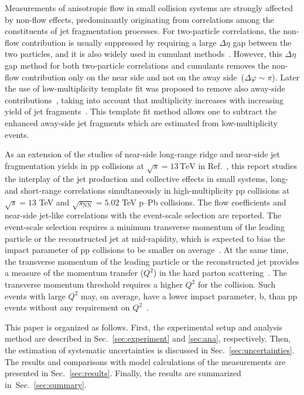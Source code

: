 Measurements of anisotropic flow in small collision systems are strongly affected by non-flow effects, predominantly originating from correlations among the constituents of jet fragmentation processes.
For two-particle correlations, the non-flow contribution is usually suppressed by requiring a large $\Delta\eta$ gap between the two particles,  and it is also widely used in cumulant methods~\cite{Bilandzic:2010jr, Acharya:2019vdf}. However, this $\Delta\eta$ gap method for both two-particle correlations and cumulants removes the non-flow contribution only on the near side and not on the away side~($\Delta\varphi\sim\pi$). Later the use of low-multiplicity template fit was proposed to remove also away-side contributions~\cite{ATLAS:2015hzw,ATLAS:2016yzd,ATLAS:2018ngv}, taking into account that multiplicity increases with increasing yield of jet fragments~\cite{CMS:2013ycn,ALICE:2013tla,ALICE:2014mas}. This template fit method allows one to subtract the enhanced away-side jet fragments which are estimated from low-multiplicity events. %

As an extension of the studies of near-side long-range ridge and near-side jet fragmentation yields in pp collisions at $\sqrt{s}=13\,\mathrm{TeV}$ in Ref.~\cite{ALICE:2021nir}, this report studies the interplay of the jet production and collective effects in small systems, long- and short-range correlations simultaneously in high-multiplicity pp collisions at $\sqrt{s} =13$ TeV and $\sqrt{s_{\mathrm{NN}}}=5.02$ TeV p--Pb collisions. The flow coefficients and near-side jet-like correlations with the event-scale selection are reported. The event-scale selection requires a minimum transverse momentum of the leading particle or the reconstructed jet at mid-rapidity, which is expected to bias the impact parameter of pp collisions to be smaller on average~\cite{Sjostrand:1986ep,Frankfurt:2003td,Frankfurt:2010ea}. At the same time, the transverse momentum of the leading particle or the reconstructed jet provides a measure of the momentum transfer ($Q^2$) in the hard parton scattering~\cite{Chatrchyan:2012tt, Chatrchyan:2011id}. The transverse momentum threshold requires a higher $Q^2$ for the collision. Such events with large $Q^2$ may, on average, have a lower impact parameter, b, than pp events without any requirement on $Q^2$~\cite{Frankfurt:2003td}.

This paper is organized as follows. First, the experimental setup and analysis method are described in Sec.~\ref{sec:experiment} and \ref{sec:ana}, respectively. Then, the estimation of systematic uncertainties is discussed in Sec.~\ref{sec:uncertainties}. The results and comparisons with model calculations of the measurements are presented in Sec.~\ref{sec:results}. Finally, the results are summarized in~Sec.~\ref{sec:summary}.

 
